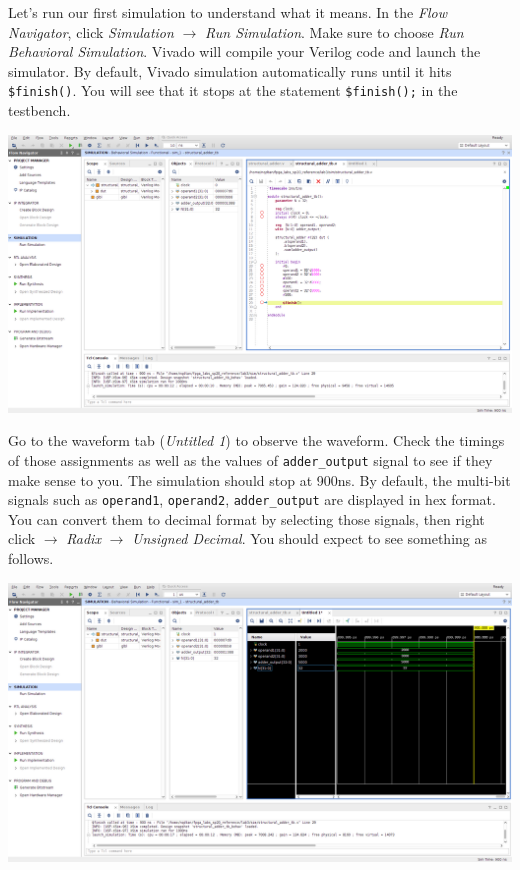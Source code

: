\documentclass[11pt]{article}
\begin{document}
Let's run our first simulation to understand what it means. In the \emph{Flow Navigator}, click \emph{Simulation} $\rightarrow$ \emph{Run Simulation}. Make sure to choose \emph{Run Behavioral Simulation}. Vivado will compile your Verilog code and launch the simulator. By default, Vivado simulation automatically runs until it hits \verb|$finish()|. You will see that it stops at the statement \verb|$finish();| in the testbench.

\begin{center}
\includegraphics[width=1.0\textwidth]{figs/vivado_sim0.png}
\end{center}

Go to the waveform tab (\emph{Untitled 1}) to observe the waveform. Check the timings of those assignments as well as the values of \verb|adder_output| signal to see if they make sense to you. The simulation should stop at 900ns. By default, the multi-bit signals such as \verb|operand1|, \verb|operand2|, \verb|adder_output| are displayed in hex format. You can convert them to decimal format by selecting those signals, then right click $\rightarrow$ \emph{Radix} $\rightarrow$ \emph{Unsigned Decimal}. You should expect to see something as follows.

\begin{center}
\includegraphics[width=1.0\textwidth]{figs/vivado_sim2.png}
\end{center}
\end{document}
